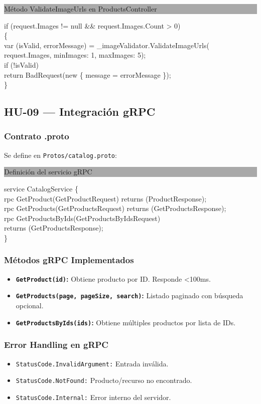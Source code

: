 \documentclass[12pt,a4paper]{article}
\newcommand{\codeblock}[2]{%
  \vspace{4pt}%
  \noindent\colorbox{darkgray}{\parbox{\dimexpr\textwidth-2\fboxsep}{%
    \bfseries\small\color{white}\strut\quad #1}}%
  \begin{codeframe}%
  {\color{codetext}\ttfamily\small\sloppy%
  \setlength{\parindent}{0pt}%
  #2}%
  \end{codeframe}%
  \vspace{4pt}%
}
\begin{document}
\codeblock{M\'etodo ValidateImageUrls en ProductsController}{%
if (request.Images != null \&\& request.Images.Count > 0)\\
\{\\
\quad var (isValid, errorMessage) = \_imageValidator.ValidateImageUrls(\\
\quad\quad request.Images, minImages: 1, maxImages: 5);\\
\quad if (!isValid)\\
\quad\quad return BadRequest(new \{ message = errorMessage \});\\
\}%
}

\subsection{HU-09 --- Integraci\'on gRPC}

\subsubsection{Contrato .proto}

Se define en \texttt{Protos/catalog.proto}:

\codeblock{Definici\'on del servicio gRPC}{%
service CatalogService \{\\
\quad rpc GetProduct(GetProductRequest) returns (ProductResponse);\\
\quad rpc GetProducts(GetProductsRequest) returns (GetProductsResponse);\\
\quad rpc GetProductsByIds(GetProductsByIdsRequest)\\
\quad\quad\quad\quad returns (GetProductsResponse);\\
\}%
}

\subsubsection{M\'etodos gRPC Implementados}

\begin{itemize}[leftmargin=1.5em]
  \item \textbf{\texttt{GetProduct(id)}:} Obtiene producto por ID. Responde <100ms.
  \item \textbf{\texttt{GetProducts(page, pageSize, search)}:} Listado paginado con b\'usqueda opcional.
  \item \textbf{\texttt{GetProductsByIds(ids)}:} Obtiene m\'ultiples productos por lista de IDs.
\end{itemize}

\subsubsection{Error Handling en gRPC}
\begin{itemize}[leftmargin=1.5em]
  \item \texttt{StatusCode.InvalidArgument:} Entrada inválida.
  \item \texttt{StatusCode.NotFound:} Producto/recurso no encontrado.
  \item \texttt{StatusCode.Internal:} Error interno del servidor.
\end{itemize}
\end{document}
